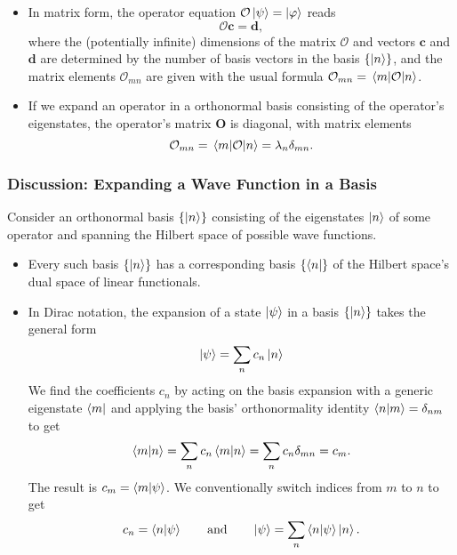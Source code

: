 \documentclass[11pt, a4paper]{article}
\newcommand{\eqtext}[1]{\qquad \text{#1} \qquad}
\renewcommand{\vec}[1]{\bm{#1}}  %
\renewcommand{\O}{\mathcal{O}}  %
\newcommand{\p}{\psi}  %
\begin{document}
\begin{itemize}
    \item In matrix form, the operator equation $ \O \ket{\psi} = \ket{\varphi} $ reads
    \begin{equation*}
        \bm{\O} \vec{c} = \vec{d},
    \end{equation*}
    where the (potentially infinite) dimensions of the matrix $ \bm{\O} $ and vectors $ \vec{c} $ and $ \vec{d} $ are determined by the number of basis vectors in the basis $ \{\ket{n}\} $, and the matrix elements $ \O_{mn} $ are given with the usual formula $ \O_{mn} = \mel{m}{\O}{n} $.
    
    \item If we expand an operator in a orthonormal basis consisting of the operator's eigenstates, the operator's matrix $ \bm{O} $ is diagonal, with matrix elements
	\begin{equation*}
		\O_{mn} = \mel{m}{\O}{n} = \lambda_{n} \delta_{mn}.
	\end{equation*}
    
\end{itemize}

\subsubsection{Discussion: Expanding a Wave Function in a Basis}
Consider an orthonormal basis $ \{\ket{n}\} $ consisting of the eigenstates $ \ket{n} $ of some operator and spanning the Hilbert space of possible wave functions.
\begin{itemize}
	\item Every such basis $ \{\ket{n}\} $ has a corresponding basis $ \{\bra{n}\} $ of the Hilbert space's dual space of linear functionals. 
	
	\item In Dirac notation, the expansion of a state $ \ket{\p} $ in a basis $ \{\ket{n}\} $ takes the general form
	\begin{equation*}
		\ket{\psi} = \sum_{n}c_{n} \ket{n}
	\end{equation*}
	We find the coefficients $ c_{n} $ by acting on the basis expansion with a generic eigenstate $ \bra{m} $ and applying the basis' orthonormality identity $ \braket{n}{m} = \delta_{nm} $ to get
	\begin{equation*}
		\braket{m}{n} = \sum_{n}c_{n} \braket{m}{n} = \sum_{n}c_{n}\delta_{mn} = c_{m}.
	\end{equation*}
    The result is $ c_{m} = \braket{m}{\psi} $. We conventionally switch indices from $ m $ to $ n $ to get
	\begin{equation*}
		c_{n} = \braket{n}{\psi} \eqtext{and} \ket{\psi} = \sum_{n} \braket{n}{\psi} \ket{n}.
	\end{equation*}
	
\end{itemize}
\end{document}
